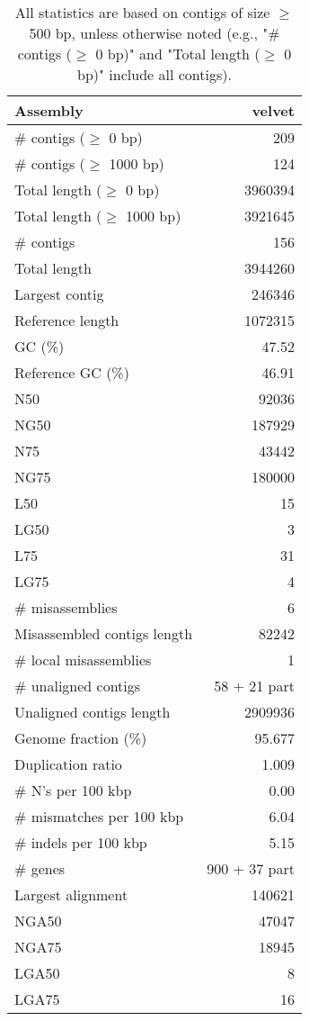 \documentclass[12pt,a4paper]{article}
\begin{document}
\begin{table}[ht]
\begin{center}
\caption{All statistics are based on contigs of size $\geq$ 500 bp, unless otherwise noted (e.g., "\# contigs ($\geq$ 0 bp)" and "Total length ($\geq$ 0 bp)" include all contigs).}
\begin{tabular}{|l*{1}{|r}|}
\hline
Assembly & velvet \\ \hline
\# contigs ($\geq$ 0 bp) & 209 \\ \hline
\# contigs ($\geq$ 1000 bp) & 124 \\ \hline
Total length ($\geq$ 0 bp) & 3960394 \\ \hline
Total length ($\geq$ 1000 bp) & 3921645 \\ \hline
\# contigs & 156 \\ \hline
Total length & 3944260 \\ \hline
Largest contig & 246346 \\ \hline
Reference length & 1072315 \\ \hline
GC (\%) & 47.52 \\ \hline
Reference GC (\%) & 46.91 \\ \hline
N50 & 92036 \\ \hline
NG50 & 187929 \\ \hline
N75 & 43442 \\ \hline
NG75 & 180000 \\ \hline
L50 & 15 \\ \hline
LG50 & 3 \\ \hline
L75 & 31 \\ \hline
LG75 & 4 \\ \hline
\# misassemblies & 6 \\ \hline
Misassembled contigs length & 82242 \\ \hline
\# local misassemblies & 1 \\ \hline
\# unaligned contigs & 58 + 21 part \\ \hline
Unaligned contigs length & 2909936 \\ \hline
Genome fraction (\%) & 95.677 \\ \hline
Duplication ratio & 1.009 \\ \hline
\# N's per 100 kbp & 0.00 \\ \hline
\# mismatches per 100 kbp & 6.04 \\ \hline
\# indels per 100 kbp & 5.15 \\ \hline
\# genes & 900 + 37 part \\ \hline
Largest alignment & 140621 \\ \hline
NGA50 & 47047 \\ \hline
NGA75 & 18945 \\ \hline
LGA50 & 8 \\ \hline
LGA75 & 16 \\ \hline
\end{tabular}
\end{center}
\end{table}
\end{document}
